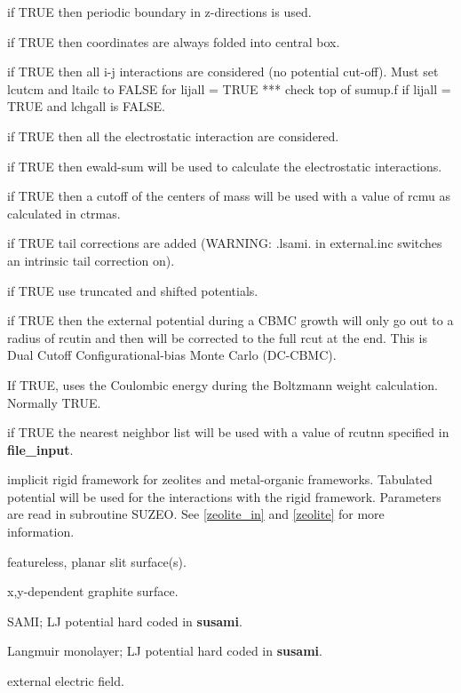 \documentclass[12pt,letterpaper]{article}
\begin{document}
 if TRUE then periodic boundary in z-directions is used.

 if TRUE then coordinates are always folded into central box.

 if TRUE then all i-j interactions are
considered (no potential cut-off). Must set lcutcm and
ltailc to FALSE for lijall = TRUE *** check top of sumup.f
if lijall = TRUE and lchgall is FALSE.

 if TRUE then all the electrostatic
interaction are considered.

 if TRUE then ewald-sum will be used to
calculate the electrostatic interactions.

 if TRUE then a cutoff of the centers
of mass will be used with a value of rcmu as calculated in
ctrmas.

 if TRUE tail corrections are added
(WARNING: .lsami. in external.inc switches an intrinsic tail
correction on).

 if TRUE use truncated and shifted potentials.

 if TRUE then the external potential
during a CBMC growth will only go out to a radius of rcutin
and then will be corrected to the full rcut at the end. This
is Dual Cutoff Configurational-bias Monte Carlo (DC-CBMC).

 If TRUE, uses the Coulombic
energy during the Boltzmann weight calculation. Normally
TRUE.

 if TRUE the nearest neighbor list will
be used with a value of rcutnn specified in {\bf
  file\_input}.

 implicit rigid framework for zeolites
and metal-organic frameworks. Tabulated potential will be
used for the interactions with the rigid framework.
Parameters are read in subroutine SUZEO. See
\ref{zeolite_in} and \ref{zeolite} for more information.

 featureless, planar slit surface(s).

 x,y-dependent graphite surface.

 SAMI; LJ potential hard coded in {\bf susami}.

 Langmuir monolayer; LJ potential hard coded in {\bf susami}.

 external electric field.
\end{document}
